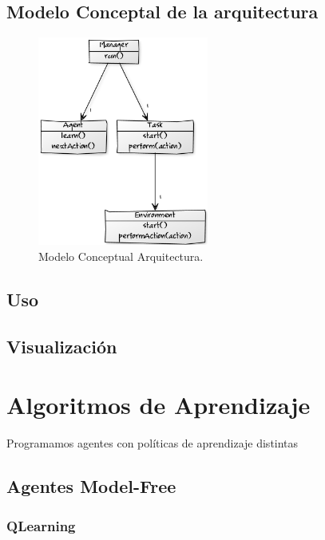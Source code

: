 \documentclass[a4paper,spanish] {article}
\begin{document}
	\subsection{Modelo Conceptal de la arquitectura}
	
	\begin{figure}[h!]
  \centering
    \includegraphics[width=0.5\textwidth]{MCarquitectra.png}
  \caption{Modelo Conceptual Arquitectura.}

\end{figure}
	
	
	\subsection{Uso}
	\subsection{Visualización}
	
\section{Algoritmos de Aprendizaje}
	Programamos agentes con políticas de aprendizaje distintas 
	\subsection{Agentes Model-Free}
		\subsubsection{QLearning}
\end{document}
